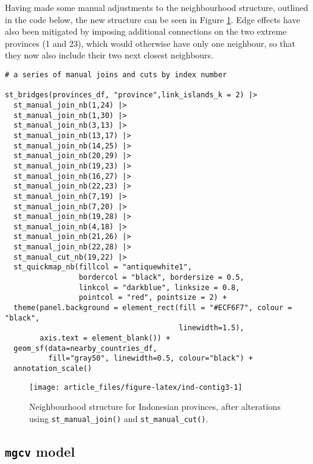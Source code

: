 Having made some manual adjustments to the neighbourhood structure, outlined in the code below, the
new structure can be seen in Figure \ref{fig:ind-contig3}. Edge effects
have also been mitigated by imposing additional connections on the two extreme
provinces (1 and 23), which would otherwise have only one neighbour, so that they now also include
their two next closest neighbours.



\begin{verbatim}
# a series of manual joins and cuts by index number

st_bridges(provinces_df, "province",link_islands_k = 2) |> 
  st_manual_join_nb(1,24) |> 
  st_manual_join_nb(1,30) |> 
  st_manual_join_nb(3,13) |> 
  st_manual_join_nb(13,17) |> 
  st_manual_join_nb(14,25) |> 
  st_manual_join_nb(20,29) |>
  st_manual_join_nb(19,23) |> 
  st_manual_join_nb(16,27) |> 
  st_manual_join_nb(22,23) |> 
  st_manual_join_nb(7,19) |> 
  st_manual_join_nb(7,20) |>
  st_manual_join_nb(19,28) |> 
  st_manual_join_nb(4,18) |> 
  st_manual_join_nb(21,26) |> 
  st_manual_join_nb(22,28) |> 
  st_manual_cut_nb(19,22) |> 
  st_quickmap_nb(fillcol = "antiquewhite1", 
                 bordercol = "black", bordersize = 0.5, 
                 linkcol = "darkblue", linksize = 0.8, 
                 pointcol = "red", pointsize = 2) + 
  theme(panel.background = element_rect(fill = "#ECF6F7", colour = "black", 
                                        linewidth=1.5),
        axis.text = element_blank()) +
  geom_sf(data=nearby_countries_df, 
          fill="gray50", linewidth=0.5, colour="black") + 
  annotation_scale()
\end{verbatim}

\begin{figure}

{\centering \texttt{[image: article\_files/figure-latex/ind-contig3-1]} 

}

\caption{Neighbourhood structure for Indonesian provinces, after alterations using \texttt{st\_manual\_join()} and \texttt{st\_manual\_cut()}.}\label{fig:ind-contig3}
\end{figure}

\hypertarget{mgcv-model}{%
\subsection{\texorpdfstring{\texttt{mgcv} model}{mgcv model}}\label{mgcv-model}}

